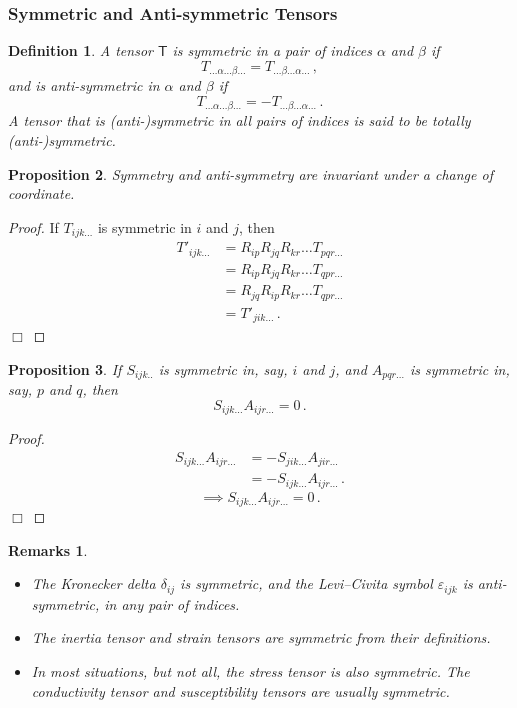 \documentclass{article}
\theoremstyle{plain}\theoremheaderfont{\normalfont\itshape}\theorembodyfont{\rmfamily}\theoremseparator{.}\newtheorem*{rem}{Remark}\newtheorem*{ex}{Example}\newtheorem*{proof}{Proof}\newtheorem*{altp}{Alternative proof}
\theoremstyle{plain}\theoremheaderfont{\normalfont\bfseries}\theorembodyfont{\rmfamily}\theoremseparator{.}\newtheorem{thm}{Theorem}[section]\newtheorem{lem}[thm]{Lemma}\newtheorem{prop}[thm]{Proposition}\newtheorem*{cor}{Corollary}\newtheorem{defn}[thm]{Definition}\newtheorem{clm}[thm]{Claim}\newtheorem{clminproof}{Claim}
\theoremstyle{break}\theoremheaderfont{\normalfont\itshape}\theorembodyfont{\rmfamily}\theoremseparator{.\medskip}\newtheorem*{proofskip}{Proof}\newtheorem*{exs}{Examples}\newtheorem*{rems}{Remarks}
\theoremstyle{break}\theoremheaderfont{\normalfont\bfseries}\theorembodyfont{\rmfamily}\theoremseparator{.\medskip}\newtheorem{lemskip}[thm]{Lemma}\newtheorem{defnskip}[thm]{Definition}\newtheorem{propskip}[thm]{Proposition}\newtheorem{thmskip}[thm]{Theorem}
\numberwithin{equation}{section}
\newcommand{\qed}{\hfill\ensuremath{\Box}}
\begin{document}
	\subsubsection{Symmetric and Anti-symmetric Tensors}
	\begin{defn}
		A tensor \(\mathsf{T}\) is \textit{symmetric} in a pair of indices \(\alpha\) and \(\beta\) if
		\[T_{\dots\alpha\dots\beta\dots}=T_{\dots\beta\dots\alpha\dots}\,,\]
		and is \textit{anti-symmetric} in \(\alpha\) and \(\beta\) if
		\[T_{\dots\alpha\dots\beta\dots}=-T_{\dots\beta\dots\alpha\dots}\,.\]
		A tensor that is (anti-)symmetric in all pairs of indices is said to be \textit{totally (anti-)symmetric}.
	\end{defn}
	\begin{prop}
		Symmetry and anti-symmetry are invariant under a change of coordinate.
	\end{prop}
	\begin{proof}
		If \(T_{ijk\dots}\) is symmetric in \(i\) and \(j\), then
		\begin{align*}
			T'_{ijk\dots}&=R_{ip}R_{jq}R_{kr}\dots T_{pqr\dots}\\
			&=R_{ip}R_{jq}R_{kr}\dots T_{qpr\dots}\\
			&=R_{jq}R_{ip}R_{kr}\dots T_{qpr\dots}\\
			&=T'_{jik\dots}\,.
		\end{align*}\qed
	\end{proof}
	\begin{prop}
		If \(S_{ijk..}\) is symmetric in, say, \(i\) and \(j\), and \(A_{pqr\dots}\) is symmetric in, say, \(p\) and \(q\), then
		\[S_{ijk\dots}A_{ijr\dots}=0\,.\]
	\end{prop}
	\begin{proof}
		\begin{align*}
			S_{ijk\dots}A_{ijr\dots}&=-S_{jik\dots}A_{jir\dots}\\
			&=-S_{ijk\dots}A_{ijr\dots}\,.
		\end{align*}
		\[\implies S_{ijk\dots}A_{ijr\dots}=0\,.\]\qed
	\end{proof}
	\begin{rems}
		\begin{itemize}[topsep=0pt]
			\item The Kronecker delta \(\delta_{ij}\) is symmetric, and the Levi--Civita symbol \(\varepsilon_{ijk}\) is anti-symmetric, in any pair of indices.
			\item The inertia tensor and strain tensors are symmetric from their definitions.
			\item In most situations, but not all, the stress tensor is also symmetric. The conductivity
			tensor and susceptibility tensors are usually symmetric.
		\end{itemize}
	\end{rems}
\end{document}
